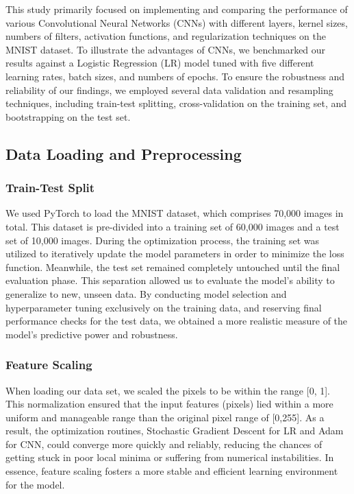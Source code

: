 This study primarily focused on implementing and comparing the performance of various Convolutional Neural Networks (CNNs) with different layers, kernel sizes, numbers of filters, activation functions, and regularization techniques on the MNIST dataset. To illustrate the advantages of CNNs, we benchmarked our results against a Logistic Regression (LR) model tuned with five different learning rates, batch sizes, and numbers of epochs. To ensure the robustness and reliability of our findings, we employed several data validation and resampling techniques, including train-test splitting, cross-validation on the training set, and bootstrapping on the test set.                


\subsection{Data Loading and Preprocessing}

\subsubsection{Train-Test Split}

We used PyTorch to load the MNIST dataset, which comprises 70,000 images in total. This dataset is pre-divided into a training set of 60,000 images and a test set of 10,000 images. During the optimization process, the training set was utilized to iteratively update the model parameters in order to minimize the loss function. Meanwhile, the test set remained completely untouched until the final evaluation phase. This separation allowed us to evaluate the model's ability to generalize to new, unseen data. By conducting model selection and hyperparameter tuning exclusively on the training data, and reserving final performance checks for the test data, we obtained a more realistic measure of the model’s predictive power and robustness.

\subsubsection{Feature Scaling}
When loading our data set, we scaled the pixels to be within the range [0, 1]. This normalization ensured that the input features (pixels) lied within a more uniform and manageable range than the original pixel range of [0,255]. As a result, the optimization routines, Stochastic Gradient Descent for LR and Adam for CNN, could converge more quickly and reliably, reducing the chances of getting stuck in poor local minima or suffering from numerical instabilities. In essence, feature scaling fosters a more stable and efficient learning environment for the model. 


